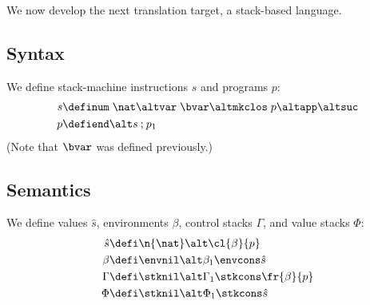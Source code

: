 \documentclass[12pt]{article}
\newcommand{\ensurecommand}[1]{\providecommand{#1}{}\renewcommand{#1}}
\begin{document}
We now develop the next translation target, a stack-based language.

\subsection*{Syntax}

\ensurecommand{\sinst}{s}
\ensurecommand{\sprog}{p}

\ensurecommand{\snum}[1]{\mathtt{num} \; #1}
\ensurecommand{\svar}[1]{\mathtt{var} \; #1}
\ensurecommand{\slam}[1]{\mathtt{mkclos} \; #1}
\ensurecommand{\sapp}{\mathtt{app}}
\ensurecommand{\ssuc}{\mathtt{suc}}

\ensurecommand{\send}{\mathtt{end}}
\ensurecommand{\sseq}{\mathbin{;}}

We define stack-machine instructions $\sinst$ and programs $\sprog$:
\begin{align*}
  \sinst &\defi \snum{\nat} \alt \svar{\bvar} \alt \slam{\sprog} \alt \sapp \alt \ssuc \\
  \sprog &\defi \send \alt \sinst \sseq \sprog_1
\end{align*}
(Note that $\bvar$ was defined previously.)

\subsection*{Semantics}

\ensurecommand{\sval}{\hat{s}}
\ensurecommand{\senv}{\beta}
\ensurecommand{\sctrl}{\Gamma}
\ensurecommand{\svals}{\Phi}

\ensurecommand{\sev}[2]{\ensuremath{#1 \downarrow #2}}%
\ensurecommand{\sstep}[4]{\ensuremath{\tup{#1 \tupsep #2} \rightarrow \tup{#3 \tupsep #4}}}
\ensurecommand{\ssteps}[4]{\ensuremath{\tup{#1 \tupsep #2} \rightarrow^* \tup{#3 \tupsep #4}}}
\ensurecommand{\slook}[3]{\ensuremath{#1 \vdash #2 \uparrow #3}}%

We define values $\sval$, environments $\senv$, control stacks $\sctrl$, and value stacks $\svals$:
\begin{align*}
  \sval &\defi \n{\nat} \alt \cl{\senv}{\sprog} \\
  \senv &\defi \envnil \alt \senv_1 \envcons \sval \\
  \sctrl &\defi \stknil \alt \sctrl_1 \stkcons \fr{\senv}{\sprog} \\
  \svals &\defi \stknil \alt \svals_1 \stkcons \sval \\
\end{align*}
\end{document}

